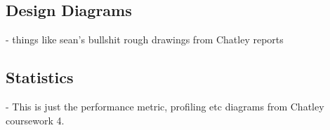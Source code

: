 \documentclass[a4paper, 11pt]{article}
\begin{document}
  \subsection{Design Diagrams}

  - things like sean's bullshit rough drawings from Chatley reports

  \subsection{Statistics}

  - This is just the performance metric, profiling etc diagrams from 
  Chatley coursework 4.

%
%
%
%
%
%
%
%
%
%
\end{document}
